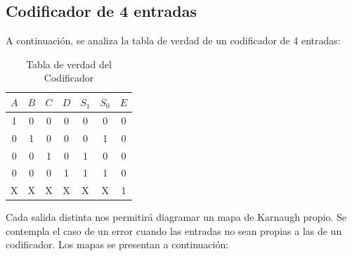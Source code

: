 \subsection{Codificador de 4 entradas}
A continuación, se analiza la tabla de verdad de un codificador de 4 entradas:
\begin{table}[H]
	\begin{center}
		\begin{tabular}{|c|c|c|c||c|c|c|}
			\hline
			$A$ &	$B$ &	$C$ &	$D$ & $S_1$ & $S_0$& $E$ \\
			\hline

            1 & 0 & 0 & 0 & 0 & 0 & 0  \\
            \hline
  
            0 & 1 & 0 & 0 & 0 & 1 & 0 \\
            \hline
         
            0 & 0 & 1 & 0 & 1 & 0 & 0 \\
            \hline              
         
            0 & 0 & 0 & 1 & 1 & 1 & 0 \\
            \hline
            
            X & X & X & X & X & X & 1 \\
            \hline		
		\end{tabular}
		\caption{Tabla de verdad del Codificador}
	\end{center}
\end{table}
Cada salida distinta nos permitirá diagramar un mapa de Karnaugh propio. Se contempla el caso de un error cuando las entradas no sean propias a las de un codificador. Los mapas se presentan a continuación:

